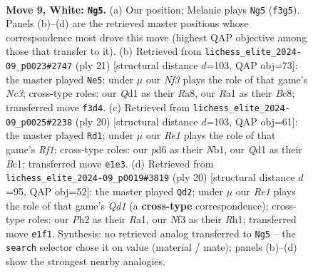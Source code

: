\documentclass[11pt]{article}
\begin{document}
\begin{figure}[p]\centering
\begin{subfigure}{0.46\textwidth}\centering
\resizebox{\linewidth}{!}{%
\newchessgame
\chessboard[
  setfen={r2qk2r/2pbbppp/p1np1n2/1p2p3/P3P3/1B3N2/1PPP1PPP/RNBQR1K1 w kq - 1 9},
  showmover=false,
  pgfstyle=straightmove, color=movearrow, markmove={f3-g5}
]}
\caption{}
\end{subfigure}\hfill
\begin{subfigure}{0.46\textwidth}\centering
\resizebox{\linewidth}{!}{%
\newchessgame
\chessboard[
  setfen={r1b2rk1/ppq2ppp/2nbpn2/3p4/1PP5/P3PN2/1B1N1PPP/2RQKB1R b K - 2 11},
  showmover=false,
  pgfstyle=straightmove, color=movearrow, markmove={c6-e5}
]}
\caption{}
\end{subfigure}
\\[4pt]
\begin{subfigure}{0.46\textwidth}\centering
\resizebox{\linewidth}{!}{%
\newchessgame
\chessboard[
  setfen={r2qkb1r/1b1n1ppp/p3pn2/1p6/P1pP4/4PN2/1PB1QPPP/RNB2RK1 w kq - 2 11},
  showmover=false,
  pgfstyle=straightmove, color=movearrow, markmove={f1-d1}
]}
\caption{}
\end{subfigure}\hfill
\begin{subfigure}{0.46\textwidth}\centering
\resizebox{\linewidth}{!}{%
\newchessgame
\chessboard[
  setfen={r2qk2r/1p1bbpp1/p1nppn1p/8/3NP1P1/1PN4P/PBP2PB1/R2QK2R w KQkq - 3 11},
  showmover=false,
  pgfstyle=straightmove, color=movearrow, markmove={d1-d2}
]}
\caption{}
\end{subfigure}
\caption{\textbf{Move 9, White: \texttt{Ng5}.} (a) Our position; Melanie plays \texttt{Ng5} (\texttt{f3g5}). Panels (b)--(d) are the retrieved master positions whose correspondence most drove this move (highest QAP objective among those that transfer to it). (b) Retrieved from \texttt{lichess\_elite\_2024-09\_p0023\#2747} (ply 21) [structural distance $d$=103, QAP obj=73]: the master played \texttt{Ne5}; under $\mu$ our \emph{Nf3} plays the role of that game's \emph{Nc3}; cross-type roles: our \emph{Q}d1 as their \emph{R}a8, our \emph{R}a1 as their \emph{B}c8; transferred move \texttt{f3d4}. (c) Retrieved from \texttt{lichess\_elite\_2024-09\_p0025\#2238} (ply 20) [structural distance $d$=103, QAP obj=61]: the master played \texttt{Rd1}; under $\mu$ our \emph{Re1} plays the role of that game's \emph{Rf1}; cross-type roles: our \emph{p}d6 as their \emph{N}b1, our \emph{Q}d1 as their \emph{B}c1; transferred move \texttt{e1e3}. (d) Retrieved from \texttt{lichess\_elite\_2024-09\_p0019\#3819} (ply 20) [structural distance $d$=95, QAP obj=52]: the master played \texttt{Qd2}; under $\mu$ our \emph{Re1} plays the role of that game's \emph{Qd1} (a \textbf{cross-type} correspondence); cross-type roles: our \emph{P}h2 as their \emph{R}a1, our \emph{N}f3 as their \emph{R}h1; transferred move \texttt{e1f1}. Synthesis: no retrieved analog transferred to \texttt{Ng5} -- the \texttt{search} selector chose it on value (material / mate); panels (b)--(d) show the strongest nearby analogies.}
\label{fig:thought-m16}
\end{figure}
\end{document}
